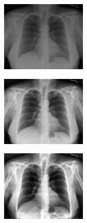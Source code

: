 \documentclass[spanish,twocolumn]{article}
\begin{document}
{\begin{minipage}[b]{1.0\linewidth}
   \begin{minipage}[t]{0.3\linewidth}  
   		\centering
        \includegraphics[width=4.1cm]{Figures/100_IM-0002-1001.png}
  	\end{minipage}
  \hspace{1pt}
   \begin{minipage}[t]{0.3\linewidth}  
   		\centering
        \includegraphics[width=4.1cm]{Figures/1182-100_IM-0002-1001.png}
  	\end{minipage}
  \hspace{1pt}
   \begin{minipage}[t]{0.3\linewidth}  
   		\centering
        \includegraphics[width=4.1cm]{Figures/738-100_IM-0002-1001.png}
  	\end{minipage}
  \vspace{0.5cm}
    \label{fig:resultado1}

\end{minipage}

\begin{minipage}[b]{1.0\linewidth}
  

\end{minipage}}
\end{document}
